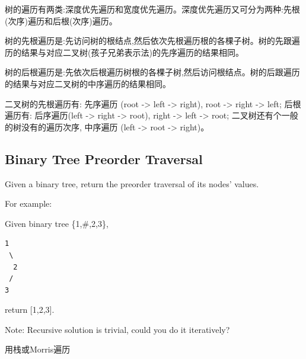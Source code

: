 \documentclass[12pt]{book}
\begin{document}
树的遍历有两类:深度优先遍历和宽度优先遍历。深度优先遍历又可分为两种:先根(次序)遍历和后根(次序)遍历。

树的先根遍历是:先访问树的根结点,然后依次先根遍历根的各棵子树。树的先跟遍历的结果与对应二叉树(孩子兄弟表示法)的先序遍历的结果相同。

树的后根遍历是:先依次后根遍历树根的各棵子树,然后访问根结点。树的后跟遍历的结果与对应二叉树的中序遍历的结果相同。

二叉树的先根遍历有: 先序遍历 (root -> left -> right), root -> right -> left; 后根遍历有: 后序遍历(left -> right -> root), right -> left -> root; 二叉树还有个一般的树没有的遍历次序, 中序遍历 (left -> root -> right)。

\subsection{Binary Tree Preorder Traversal}
\label{sec-4-2-1}
Given a binary tree, return the preorder traversal of its nodes' values.

For example:

Given binary tree \{1,\#,2,3\},
\lstset{language=java,label= ,caption= ,numbers=none}
\begin{lstlisting}
1
 \
  2
 /
3
\end{lstlisting}

return [1,2,3].

Note: Recursive solution is trivial, could you do it iteratively?

用栈或Morris遍历
\end{document}
